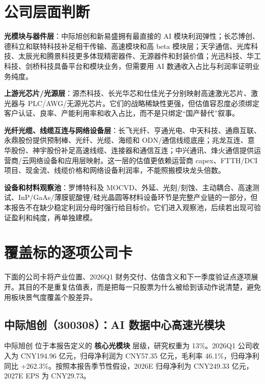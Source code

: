 
\section{公司层面判断}
\textbf{光模块与器件层}：中际旭创和新易盛拥有最直接的 AI 模块利润弹性；长芯博创、德科立和联特科技补足相干传输、高速模块和高 beta 模块层；天孚通信、光库科技、太辰光和腾景科技更多体现精密器件、无源器件和封装价值；光迅科技、华工科技、剑桥科技具备平台和模块业务，但需要用 AI 数通收入占比与利润率证明业务纯度。

\textbf{上游光芯片/光源层}：源杰科技、长光华芯和仕佳光子分别映射高速激光芯片、激光器与 PLC/AWG/无源光芯片。它们的战略稀缺性更强，但估值容忍度必须绑定客户认证、良率、产能利用率和收入占比，而不是只绑定“国产替代”叙事。

\textbf{光纤光缆、线缆互连与网络设备层}：长飞光纤、亨通光电、中天科技、通鼎互联、永鼎股份提供预制棒、光纤、光缆、海缆和 ODN/通信线缆底座；兆龙互连、意华股份、神宇股份补足高速线缆、连接器和通信互连；中兴通讯、烽火通信提供运营商/云网络设备和应用层映射。这一层的估值更依赖运营商 capex、FTTH/DCI 项目、现金流、线缆价格和网络设备利润率，不能照搬模块龙头倍数。

\textbf{设备和材料观察池}：罗博特科及 MOCVD、外延、光刻/刻蚀、主动耦合、高速测试、InP/GaAs/薄膜铌酸锂/硅光晶圆等材料设备环节是完整产业链的一部分，但本报告不在缺少稳定利润分母时强行给目标价。它们进入观察池，后续若出现可验证盈利和纯度，再单独建模。

\section{覆盖标的逐项公司卡}
下面的公司卡将产业位置、2026Q1 财务交付、估值含义和下一季度验证点逐项展开。其目的不是重复估值表，而是把每一只股票为什么被给到该动作说清楚，避免用板块景气度覆盖个股差异。

\subsection{中际旭创（300308）：AI 数据中心高速光模块}
中际旭创 位于本报告定义的 \textbf{核心光模块} 层级，研究权重为 13\%。2026Q1 公司收入为 CNY194.96 亿元，归母净利润为 CNY57.35 亿元，毛利率 46.1\%，归母净利同比 +262.3\%。按照本报告季节性假设，2026E 归母净利为 CNY249.33 亿元，2027E EPS 为 CNY29.73。

